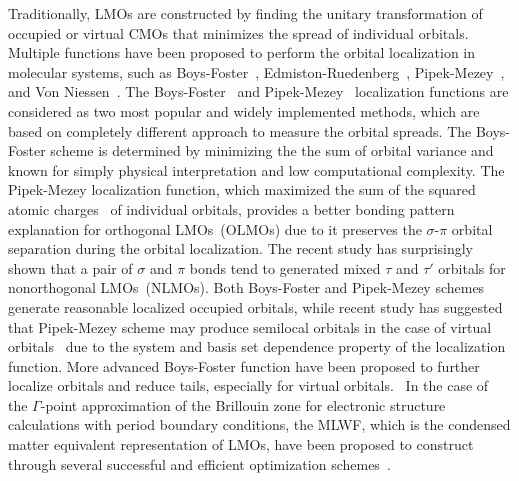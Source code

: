 \documentclass[aps,prl,reprint,amsmath,amssymb]{revtex4-1}
\begin{document}
Traditionally, LMOs are constructed by finding the unitary transformation of occupied or virtual CMOs that minimizes the spread of individual orbitals.
Multiple functions have been proposed to perform the orbital localization in molecular systems, such as Boys-Foster~\cite{boys1960construction}, Edmiston-Ruedenberg~\cite{bytautas2002electron, bytautas2003split, edmiston1963localized}, Pipek-Mezey~\cite{pipek1989fast}, and Von Niessen~\cite{niessen1972density}.
The Boys-Foster~\cite{boys1960construction} and Pipek-Mezey~\cite{pipek1989fast} localization functions are considered as two most popular and widely implemented methods, which are based on completely different approach to measure the orbital spreads.
The Boys-Foster scheme is determined by minimizing the the sum of orbital variance and known for simply physical interpretation and low computational complexity.
The Pipek-Mezey localization function, which maximized the sum of the squared atomic charges~\cite{mulliken1955electronic, lowdin1950non, lehtola2014pipek} of individual orbitals, provides a better bonding pattern explanation for orthogonal LMOs~(OLMOs) due to it preserves the $\sigma$-$\pi$ orbital separation during the orbital localization.
The recent study has surprisingly shown that a pair of $\sigma$ and $\pi$ bonds tend to generated mixed $\tau$ and $\tau'$ orbitals for nonorthogonal LMOs~(NLMOs).
Both Boys-Foster and Pipek-Mezey schemes generate reasonable localized occupied orbitals, while recent study has suggested that Pipek-Mezey scheme may produce semilocal orbitals in the case of virtual orbitals~\cite{hoyvik2013pipek} due to the system and basis set dependence property of the localization function.
More advanced Boys-Foster function have been proposed to further localize orbitals and reduce tails, especially for virtual orbitals.~\cite{jansik2011local, hoyvik2012orbital} 
In the case of the $\Gamma$-point approximation of the Brillouin zone for electronic structure calculations with period boundary conditions, the MLWF, which is the condensed matter equivalent representation of LMOs, have been proposed to construct through several successful and efficient optimization schemes~\cite{marzari2012maximally, resta1998quantum, resta1999electron, silvestrelli1999maximally, berghold2000general, jonsson2017theory}.
\end{document}

